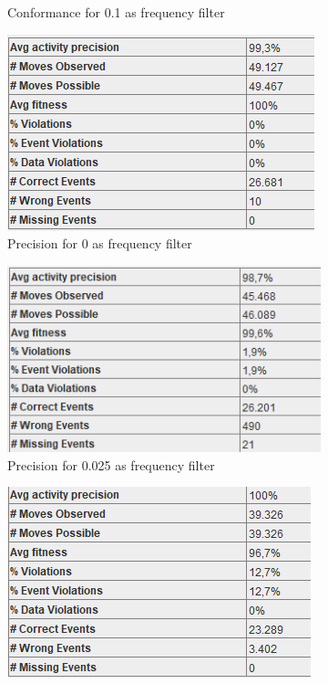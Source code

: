 \begin{figure}[!htbp]
\begin{subfigure}{.3\textwidth}
  \caption{Conformance for 0.1 as frequency filter}
  \label{fig:RejCon0-1}
\end{subfigure}
\begin{subfigure}{.3\textwidth}
  \centering
  \includegraphics[width=\linewidth]{RejPrec0.PNG}
  \caption{Precision for 0 as frequency filter}
  \label{fig:RejPrec0}
\end{subfigure}%
\begin{subfigure}{.3\textwidth}
  \centering
  \includegraphics[width=\linewidth]{RejPre0-025.PNG}
  \caption{Precision for 0.025 as frequency filter}
  \label{fig:RejPrec0-025}
\end{subfigure}
\begin{subfigure}{.3\textwidth}
  \centering
  \includegraphics[width=\linewidth]{RejPrec0-1.PNG}

\end{subfigure}
\end{figure}
